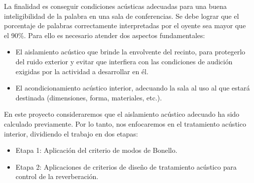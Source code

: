 La finalidad es conseguir condiciones acústicas adecuadas para una buena
inteligibilidad de la palabra en una sala de conferencias. Se debe lograr que el porcentaje de palabras correctamente interpretadas por el oyente sea mayor que el 90\%.
Para ello es necesario atender dos aspectos fundamentales:

\begin{itemize}
\item El aislamiento acústico que brinde la envolvente del recinto, para protegerlo del ruido exterior y evitar que interfiera con las condiciones de audición exigidas por la actividad a desarrollar en él.
\item El acondicionamiento acústico interior, adecuando la sala al uso al que estará destinada (dimensiones, forma, materiales, etc.).

\end{itemize}

En este proyecto consideraremos que el aislamiento acústico adecuado ha sido calculado previamente. Por lo tanto, nos enfocaremos en el tratamiento acústico interior, dividiendo el trabajo en dos etapas:\\

\begin{itemize}
    \item Etapa 1: Aplicación del criterio de modos de Bonello.
    \item Etapa 2: Aplicaciones de criterios de diseño de tratamiento acústico para control de la reverberación.
\end{itemize}


 
\hspace{1cm}

